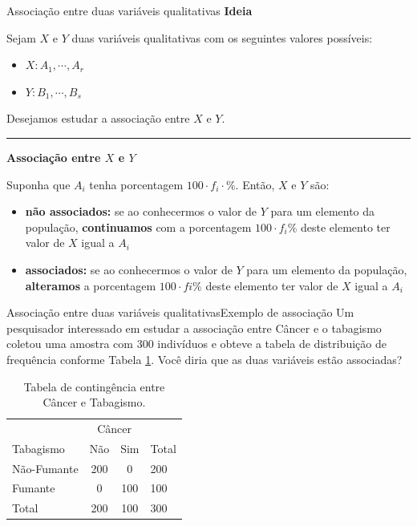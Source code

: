 \documentclass[
  10pt,
  ignorenonframetext,
]{beamer}
\providecommand{\tightlist}{%
  \setlength{\itemsep}{0pt}\setlength{\parskip}{0pt}}\usepackage{longtable,booktabs,array}
\newcommand*{\regrafina}{\rule{\textwidth}{0.5pt}}
\begin{document}
\begin{frame}{Associação entre duas variáveis qualitativas}
\protect\hypertarget{associauxe7uxe3o-entre-duas-variuxe1veis-qualitativas}{}
\textbf{Ideia}

Sejam \(X\) e \(Y\) duas variáveis qualitativas com os seguintes valores
possíveis:

\begin{itemize}
\tightlist
\item
  \(X: A_1, \cdots, A_r\)
\item
  \(Y: B_1, \cdots, B_s\)
\end{itemize}

Desejamos estudar a associação entre \(X\) e \(Y\).

\regrafina

\textbf{Associação entre \(X\) e \(Y\)}

Suponha que \(A_i\) tenha porcentagem \(100 \cdot f_i \cdot \%\). Então,
\(X\) e \(Y\) são:

\begin{itemize}
\tightlist
\item
  \textbf{não associados:} se ao conhecermos o valor de \(Y\) para um
  elemento da população, \textbf{continuamos} com a porcentagem
  \(100 \cdot f_i \%\) deste elemento ter valor de \(X\) igual a \(A_i\)
\item
  \textbf{associados:} se ao conhecermos o valor de \(Y\) para um
  elemento da população, \textbf{alteramos} a porcentagem
  \(100 \cdot fi \%\) deste elemento ter valor de \(X\) igual a \(A_i\)
\end{itemize}
\end{frame}

\begin{frame}{Associação entre duas variáveis
qualitativas\newline Exemplo de associação}
\protect\hypertarget{associauxe7uxe3o-entre-duas-variuxe1veis-qualitativasexemplo-de-associauxe7uxe3o}{}
Um pesquisador interessado em estudar a associação entre Câncer e o
tabagismo coletou uma amostra com 300 indivíduos e obteve a tabela de
distribuição de frequência conforme Tabela \ref{tab_associacao}. Você
diria que as duas variáveis estão associadas?

\begin{table}[htbp]
    \centering
    \caption{Tabela de contingência entre Câncer e Tabagismo.}
    \label{tab_associacao}
    \begin{tabular}{l|cc|l}
        \toprule[0.05cm]
        & \multicolumn{2}{|c|}{Câncer} & \\ \cmidrule{2-3}
        Tabagismo & Não & Sim & Total\\ \midrule[0.05cm]
        Não-Fumante & 200 & 0 & 200 \\
        Fumante & 0 & 100 & 100\\ \midrule[0.05cm]
        Total & 200 & 100 & 300\\ \bottomrule[0.05cm]
    \end{tabular}
\end{table}
\end{frame}
\end{document}
